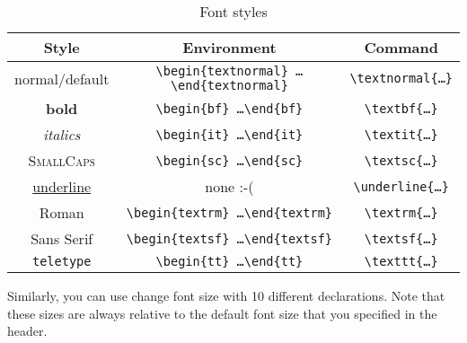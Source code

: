 \begin{table}[h]
	\centering
	\caption{Font styles}
	\label{tab:fontstyles}
\begin{small}
    \begin{tabular}{c c c}
      \hline
      Style               & Environment                                                                          & Command \\
      \hline
      normal/default      & \texttt{\textbackslash begin\{textnormal\} \ldots \textbackslash end\{textnormal\}}  & \texttt{\textbackslash textnormal\{\ldots \}}\\
      \textbf{bold}        & \texttt{\textbackslash begin\{bf\} \ldots \textbackslash end\{bf\}}  & \texttt{\textbackslash textbf\{\ldots \}}\\
      \textit{italics}     & \texttt{\textbackslash begin\{it\} \ldots \textbackslash end\{it\}}  & \texttt{\textbackslash textit\{\ldots \}}\\
      \textsc{SmallCaps}   & \texttt{\textbackslash begin\{sc\} \ldots \textbackslash end\{sc\}}  & \texttt{\textbackslash textsc\{\ldots \}}\\
      \underline{underline}&                                none  :-(                             & \texttt{\textbackslash underline\{\ldots \}}\\
      \textrm{Roman}       & \texttt{\textbackslash begin\{textrm\} \ldots \textbackslash end\{textrm\}}  & \texttt{\textbackslash textrm\{\ldots \}}\\
      \textsf{Sans Serif}  & \texttt{\textbackslash begin\{textsf\} \ldots \textbackslash end\{textsf\}}  & \texttt{\textbackslash textsf\{\ldots \}}\\
      \texttt{teletype}    & \texttt{\textbackslash begin\{tt\} \ldots \textbackslash end\{tt\}}  & \texttt{\textbackslash texttt\{\ldots \}}\\
      \hline
    \end{tabular}
\end{small}
\end{table}

Similarly, you can use change font size with 10 different declarations. Note that these sizes are always relative to the default font size that you specified in the header.

